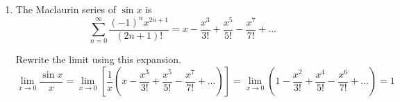 \documentclass[a4paper, 12pt]{article}
\begin{document}
\begin{enumerate}[leftmargin=*,label=\textbf{\arabic*.}]
Now, take a look at the endpoints.
\[x=-2\rightarrow\sum_{k=1}^{\infty}\frac{(-1)^k}{2k}=\frac12\sum_{k=1}^{\infty}\frac{(-1)^k}k\]

This is an alternating series. The non-alternating part, which is $\frac1k$, is nonincreasing for $k\geq1$ and it is positive. The limit at infinity is $0$. By Leibniz's Alternating Series Test, the series converges. Try $x=0$.
\[x=0\rightarrow\sum_{k=1}^{\infty}\frac{1^k}{2k}=\frac12\sum_{k=1}^{\infty}\frac1k\]

This is a $p$-series with $p=1$, for which the series diverges by the $p$-series Test.

The convergence set for the power series is
\[\boxed{[-2, 0)}\]

\item The Maclaurin series of $\sin x$ is
\[\sum_{n=0}^{\infty}\frac{(-1)^nx^{2n+1}}{(2n+1)!}=x-\frac{x^3}{3!}+\frac{x^5}{5!}-\frac{x^7}{7!}+...\]

Rewrite the limit using this expansion.
\[\lim_{x\to0}\frac{\sin x}{x}=\lim_{x\to0}\left[\frac1x\left(x-\frac{x^3}{3!}+\frac{x^5}{5!}-\frac{x^7}{7!}+...\right)\right]=\lim_{x\to0}\left(1-\frac{x^2}{3!}+\frac{x^4}{5!}-\frac{x^6}{7!}+...\right)=\boxed{1}\]

\end{enumerate}
\end{document}
